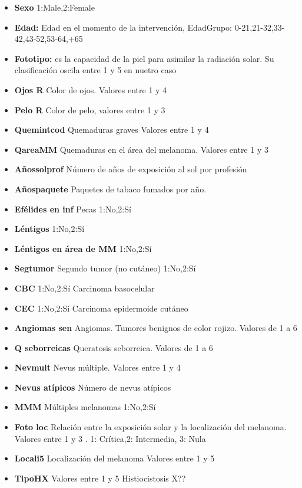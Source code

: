 \documentclass[11pt,spanish,listoffigures,listoftables]{tfgetsinf}
\begin{document}
\begin{itemize}
\item \textbf{Sexo}	1:Male,2:Female	
\item \textbf{Edad:} Edad en el momento de la intervenci\'on, EdadGrupo: 0-21,21-32,33-42,43-52,53-64,+65
\item \textbf{Fototipo:} es la capacidad de la piel para asimilar la radiaci\'on solar. Su clasificaci\'on 
oscila entre 1 y 5 en nuetro caso	
\item \textbf{Ojos R}	Color de ojos. Valores entre 1 y 4	
\item \textbf{Pelo R}	Color de pelo, valores entre 1 y 3	
\item \textbf{Quemintcod}	Quemaduras graves Valores entre 1 y 4	
\item \textbf{QareaMM} Quemaduras en el \'area del melanoma.	Valores entre 1 y 3	
\item \textbf{A\~nossolprof}	N\'umero de a\~nos de exposici\'on al sol por profesi\'on	
\item \textbf{A\~nospaquete} Paquetes de tabaco fumados por a\~no.	
\item \textbf{Ef\'elides en inf} Pecas	1:No,2:S\'i	
\item \textbf{L\'entigos}	1:No,2:S\'i	
\item \textbf{L\'entigos en \'area de MM}	1:No,2:S\'i
\item \textbf{Segtumor}	Segundo tumor (no cut\'aneo) 1:No,2:S\'i
\item \textbf{CBC}	1:No,2:S\'i Carcinoma basocelular
\item \textbf{CEC}	1:No,2:S\'i  Carcinoma epidermoide cut\'aneo
\item \textbf{Angiomas sen}	Angiomas. Tumores benignos de color rojizo. Valores de 1 a 6 	
\item \textbf{Q seborreicas}	Queratosis seborreica. Valores de 1 a 6	
\item \textbf{Nevmult}	Nevus m\'ultiple. Valores entre 1 y 4	
\item \textbf{Nevus at\'ipicos}	N\'umero de nevus at\'ipicos	
\item \textbf{MMM} M\'ultiples melanomas	1:No,2:S\'i 	
\item \textbf{Foto loc} Relaci\'on entre la exposici\'on solar y la localizaci\'on del melanoma. Valores entre 1 y 3	. 1: Cr\'itica,2: Intermedia, 3: Nula
\item \textbf{Locali5} Localizaci\'on del melanoma	Valores entre 1 y 5	
\item \textbf{TipoHX}	Valores entre 1 y 5 Histiocistosis X??	

\end{itemize}
\end{document}
